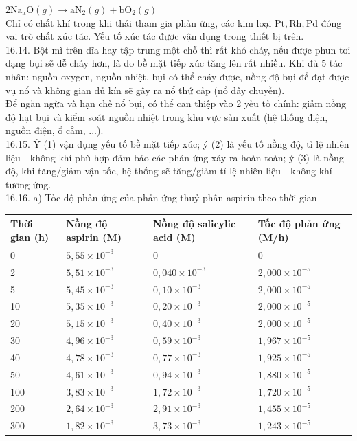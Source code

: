 \documentclass[10pt]{article}
\begin{document}
$2 \mathrm{Na}_{\mathrm{a}} \mathrm{O}(g) \rightarrow \mathrm{aN}_{2}(g)+\mathrm{bO}_{2}(g)$\\
Chỉ có chất khí trong khi thải tham gia phản ứng, các kim loại $\mathrm{Pt}, \mathrm{Rh}, \mathrm{Pd}$ đóng vai trò chất xúc tác. Yếu tố xúc tác được vận dụng trong thiết bị trên.\\
16.14. Bột mì trên dĩa hay tập trung một chỗ thì rất khó cháy, nếu được phun tơi dạng bụi sẽ dễ cháy hơn, là do bề mặt tiếp xúc tăng lên rất nhiều. Khi đủ 5 tác nhân: nguồn oxygen, nguồn nhiệt, bụi có thể cháy được, nồng độ bụi để đạt được vụ nổ và không gian đủ kín sẽ gây ra nổ thứ cấp (nổ dây chuyền).\\
Để ngăn ngừa và hạn chế nổ bụi, có thể can thiệp vào 2 yếu tố chính: giảm nồng độ hạt bụi và kiểm soát nguồn nhiệt trong khu vực sản xuất (hệ thống điện, nguồn điện, ổ cắm, ...).\\
16.15. Ý (1) vận dụng yếu tố bề mặt tiếp xúc; ý (2) là yếu tố nồng độ, tỉ lệ nhiên liệu - không khí phù hợp đảm bảo các phản ứng xảy ra hoàn toàn; ý (3) là nồng độ, khi tăng/giảm vận tốc, hệ thống sẽ tăng/giảm tỉ lệ nhiên liệu - không khí tương ứng.\\
16.16. a) Tốc độ phản ứng của phản ứng thuỷ phân aspirin theo thời gian

\begin{center}
\begin{tabular}{|l|l|l|l|}
\hline
Thời gian (h) & Nồng độ aspirin (M) & Nồng độ salicylic acid (M) & Tốc độ phản ứng (M/h) \\
\hline
0 & $5,55 \times 10^{-3}$ & 0 & 0 \\
\hline
2 & $5,51 \times 10^{-3}$ & $0,040 \times 10^{-3}$ & $2,000 \times 10^{-5}$ \\
\hline
5 & $5,45 \times 10^{-3}$ & $0,10 \times 10^{-3}$ & $2,000 \times 10^{-5}$ \\
\hline
10 & $5,35 \times 10^{-3}$ & $0,20 \times 10^{-3}$ & $2,000 \times 10^{-5}$ \\
\hline
20 & $5,15 \times 10^{-3}$ & $0,40 \times 10^{-3}$ & $2,000 \times 10^{-5}$ \\
\hline
30 & $4,96 \times 10^{-3}$ & $0,59 \times 10^{-3}$ & $1,967 \times 10^{-5}$ \\
\hline
40 & $4,78 \times 10^{-3}$ & $0,77 \times 10^{-3}$ & $1,925 \times 10^{-5}$ \\
\hline
50 & $4,61 \times 10^{-3}$ & $0,94 \times 10^{-3}$ & $1,880 \times 10^{-5}$ \\
\hline
100 & $3,83 \times 10^{-3}$ & $1,72 \times 10^{-3}$ & $1,720 \times 10^{-5}$ \\
\hline
200 & $2,64 \times 10^{-3}$ & $2,91 \times 10^{-3}$ & $1,455 \times 10^{-5}$ \\
\hline
300 & $1,82 \times 10^{-3}$ & $3,73 \times 10^{-3}$ & $1,243 \times 10^{-5}$ \\
\hline
\end{tabular}
\end{center}
\end{document}
